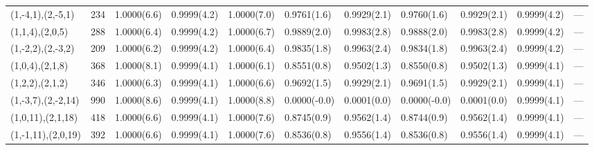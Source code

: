 \begin{tabular}{lrlllllllll}
 (1,-4,1),(2,-5,1)  &    234 & 1.0000(6.6) & 0.9999(4.2) & 1.0000(7.0) & 0.9761(1.6)    & 0.9929(2.1)  & 0.9760(1.6)    & 0.9929(2.1)  & 0.9999(4.2) & ---    \\
 (1,1,4),(2,0,5)    &    288 & 1.0000(6.4) & 0.9999(4.2) & 1.0000(6.7) & 0.9889(2.0)    & 0.9983(2.8)  & 0.9888(2.0)    & 0.9983(2.8)  & 0.9999(4.2) & ---    \\
 (1,-2,2),(2,-3,2)  &    209 & 1.0000(6.2) & 0.9999(4.2) & 1.0000(6.4) & 0.9835(1.8)    & 0.9963(2.4)  & 0.9834(1.8)    & 0.9963(2.4)  & 0.9999(4.2) & ---    \\
 (1,0,4),(2,1,8)    &    368 & 1.0000(8.1) & 0.9999(4.1) & 1.0000(6.1) & 0.8551(0.8)    & 0.9502(1.3)  & 0.8550(0.8)    & 0.9502(1.3)  & 0.9999(4.1) & ---    \\
 (1,2,2),(2,1,2)    &    346 & 1.0000(6.3) & 0.9999(4.1) & 1.0000(6.6) & 0.9692(1.5)    & 0.9929(2.1)  & 0.9691(1.5)    & 0.9929(2.1)  & 0.9999(4.1) & ---    \\
 (1,-3,7),(2,-2,14) &    990 & 1.0000(8.6) & 0.9999(4.1) & 1.0000(8.8) & 0.0000(-0.0)   & 0.0001(0.0)  & 0.0000(-0.0)   & 0.0001(0.0)  & 0.9999(4.1) & ---    \\
 (1,0,11),(2,1,18)  &    418 & 1.0000(6.6) & 0.9999(4.1) & 1.0000(7.6) & 0.8745(0.9)    & 0.9562(1.4)  & 0.8744(0.9)    & 0.9562(1.4)  & 0.9999(4.1) & ---    \\
 (1,-1,11),(2,0,19) &    392 & 1.0000(6.6) & 0.9999(4.1) & 1.0000(7.6) & 0.8536(0.8)    & 0.9556(1.4)  & 0.8536(0.8)    & 0.9556(1.4)  & 0.9999(4.1) & ---    \\
\hline
\end{tabular}